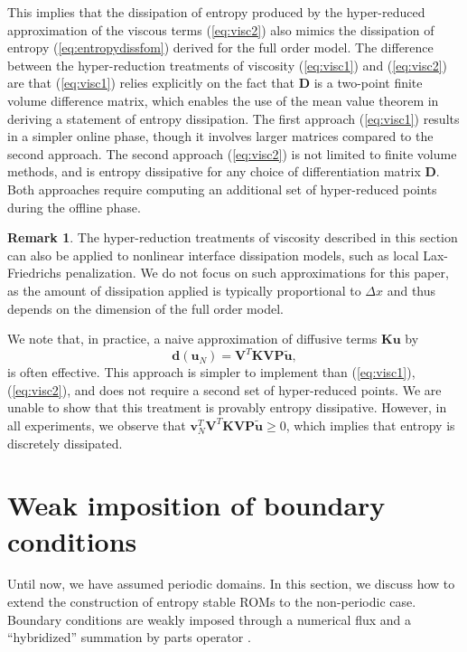 \documentclass[preprint,10pt]{elsarticle}
\theoremstyle{definition}
\theoremstyle{lemma}
\newtheorem*{remark}{Remark}
\theoremstyle{theorem}
\theoremstyle{assumption}
\renewcommand{\tilde}{\widetilde}
\begin{document}
This implies that the dissipation of entropy produced by the hyper-reduced approximation of the viscous terms (\ref{eq:visc2}) also mimics the dissipation of entropy (\ref{eq:entropydissfom}) derived for the full order model.
The difference between the hyper-reduction treatments of viscosity (\ref{eq:visc1}) and (\ref{eq:visc2}) are that (\ref{eq:visc1}) relies explicitly on the fact that $\bm{D}$ is a two-point finite volume difference matrix, which enables the use of the mean value theorem in deriving a statement of entropy dissipation.   The first approach (\ref{eq:visc1}) results in a simpler online phase, though it involves larger matrices compared to the second approach.  The second approach (\ref{eq:visc2}) is not limited to finite volume methods, and is entropy dissipative for any choice of differentiation matrix $\bm{D}$.  Both approaches require computing an additional set of hyper-reduced points during the offline phase.  

\begin{remark}
The hyper-reduction treatments of viscosity described in this section can also be applied to nonlinear interface dissipation models, such as local Lax-Friedrichs penalization.  We do not focus on such approximations for this paper, as the amount of dissipation applied is typically proportional to $\Delta x$ and thus depends on the dimension of the full order model.
\end{remark}

We note that, in practice, a naive approximation of diffusive terms $\bm{K}\bm{u}$ by
\begin{equation}
\bm{d}(\bm{u}_N) = \bm{V}^T\bm{K}\bm{V}\bm{P}\tilde{\bm{u}},
\label{eq:visc3}
\end{equation}
is often effective.  This approach is simpler to implement than (\ref{eq:visc1}), (\ref{eq:visc2}), and does not require a second set of hyper-reduced points.  We are unable to show that this treatment is provably entropy dissipative.  However, in all experiments, we observe that $\bm{v}_N^T\bm{V}^T\bm{K}\bm{V}\bm{P}\tilde{\bm{u}} \geq 0$, which implies that entropy is discretely dissipated.  



\section{Weak imposition of boundary conditions}
\label{sec:6}
Until now, we have assumed periodic domains.  In this section, we discuss how to extend the construction of entropy stable ROMs to the non-periodic case.  Boundary conditions are weakly imposed through a numerical flux and a ``hybridized'' summation by parts operator \cite{chan2017discretely}.  
\end{document}
